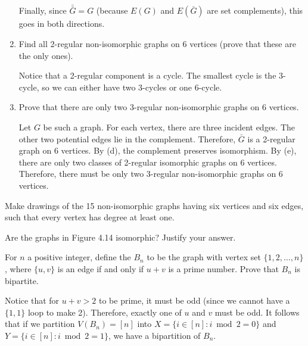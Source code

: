\begin{enumerate}
\begin{prf}
          Finally, since $\bar{\bar G} = G$ (because $E(G)$ and $E(\bar G)$ are set complements),
          this goes in both directions.
        \end{prf}
  \item Find all 2-regular non-isomorphic graphs on 6 vertices
        (prove that these are the only ones).
        \begin{prf}
          Notice that a 2-regular component is a cycle.
          The smallest cycle is the 3-cycle,
          so we can either have two 3-cycles or one 6-cycle.
        \end{prf}
  \item Prove that there are only two 3-regular non-isomorphic graphs on 6 vertices.
        \begin{prf}
          Let $G$ be such a graph.
          For each vertex, there are three incident edges.
          The other two potential edges lie in the complement.
          Therefore, $\bar G$ is a 2-regular graph on 6 vertices.
          By (d), the complement preserves isomorphism.
          By (e), there are only two classes of 2-regular isomorphic graphs on 6 vertices.
          Therefore, there must be only two 3-regular non-isomorphic graphs on 6 vertices.
        \end{prf}
\end{enumerate}

\begin{xca}
  Make drawings of the 15 non-isomorphic graphs having six vertices and six edges,
  such that every vertex has degree at least one.
\end{xca}

\begin{xca}
  Are the graphs in Figure 4.14 isomorphic? Justify your answer.
\end{xca}

\begin{xca}\label{xca:prime}
  For $n$ a positive integer, define the  $B_n$
  to be the graph with vertex set $\{1,2,\dotsc,n\}$,
  where $\{u,v\}$ is an edge if and only if $u + v$ is a prime number.
  Prove that $B_n$ is bipartite.
\end{xca}
\begin{prf}
  Notice that for $u+v > 2$ to be prime, it must be odd
  (since we cannot have a $\{1,1\}$ loop to make 2).
  Therefore, exactly one of $u$ and $v$ must be odd.
  It follows that if we partition $V(B_n) = [n]$
  into $X = \{ i \in [n] : i \bmod 2 = 0 \}$ and $Y = \{ i \in [n] : i \bmod 2 = 1 \}$,
  we have a bipartition of $B_n$.
\end{prf}

